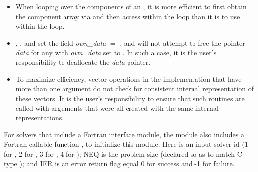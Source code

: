 \begin{itemize}
                                        
\item
  When looping over the components of an  , it is     
  more efficient to first obtain the component array via       
   and then access  within the     
  loop than it is to use  within the loop.        

\item
  {\warn}, , 
  and  set the field 
  {\em own\_data} $=$ . 
   and 
  will not attempt to free the pointer {\em data} for any  with
  {\em own\_data} set to . In such a case, it is the user's responsibility to
  deallocate the {\em data} pointer.
                                     
\item
  {\warn}To maximize efficiency, vector operations in the {\nvecs} implementation
  that have more than one  argument do not check for
  consistent internal representation of these vectors. It is the user's 
  responsibility to ensure that such routines are called with 
  arguments that were all created with the same internal representations.

\end{itemize}

For solvers that include a Fortran interface module, the {\nvecs} module
also includes a Fortran-callable function ,
to initialize this {\nvecs} module.  Here  is an input solver id
(1 for {\cvode}, 2 for {\ida}, 3 for {\kinsol}, 4 for {\arkode}); NEQ is
the problem size (declared so as to match C type ); and
IER is an error return flag equal 0 for success and -1 for failure.
